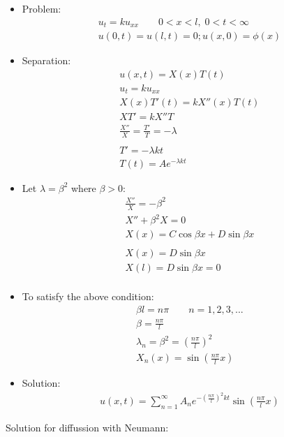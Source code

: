 \documentclass[12pt, a4paper]{article}
\begin{document}
\begin{itemize}
    \item Problem:
    \begin{gather*}
        u_t = ku_{xx}\qquad 0<x<l, \;0<t<\infty\\
        u(0, t) = u(l, t) = 0;
        u(x, 0) = \phi(x)
    \end{gather*}
    \item Separation:
    \begin{gather*}
        u(x, t) = X(x)T(t)\\
        u_t = ku_{xx}\\
        X(x)T'(t) = kX''(x)T(t)\\
        XT' = kX''T\\
        \frac{X''}{X} = \frac{T'}{T} = -\lambda\\\\
        T' = -\lambda kt\\
        T(t) = Ae^{-\lambda kt}
    \end{gather*}
    \item Let $\lambda = \beta^2$ where $\beta >0$: \\
    \begin{gather*}
        \frac{X''}{X} = -\beta^2\\
        X'' + \beta^2X = 0\\
        X(x) = C\cos{\beta x} + D\sin{\beta x}\\\\
        X(x) = D\sin{\beta x}\\
        X(l) = D\sin{\beta x} = 0\\
    \end{gather*}
    \item To satisfy the above condition:
    \begin{gather*}
        \beta l = n\pi \qquad n = 1, 2, 3, ...\\
        \beta = \frac{n\pi}{l}\\
        \lambda_n = \beta^2 = \left(\frac{n\pi}{l}\right)^2\\
        X_n(x) = \sin{\left(\frac{n\pi}{l}x\right)}
    \end{gather*}
    \item Solution:
    \begin{gather*}
        u(x, t) = \sum_{n=1}^{\infty} A_ne^{-\left(\frac{n\pi}{l}\right)^2 kt}\sin{\left(\frac{n\pi}{l}x\right)}
    \end{gather*}
\end{itemize}
Solution for diffussion with Neumann:
\end{document}
